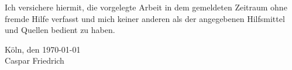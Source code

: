 
\noindent Ich versichere hiermit, die vorgelegte Arbeit in dem gemeldeten Zeitraum ohne fremde Hilfe verfasst und mich keiner anderen als der angegebenen Hilfsmittel und Quellen bedient zu haben.

\vfill

\noindent Köln, den \today \\[1cm]

\noindent Caspar Friedrich
